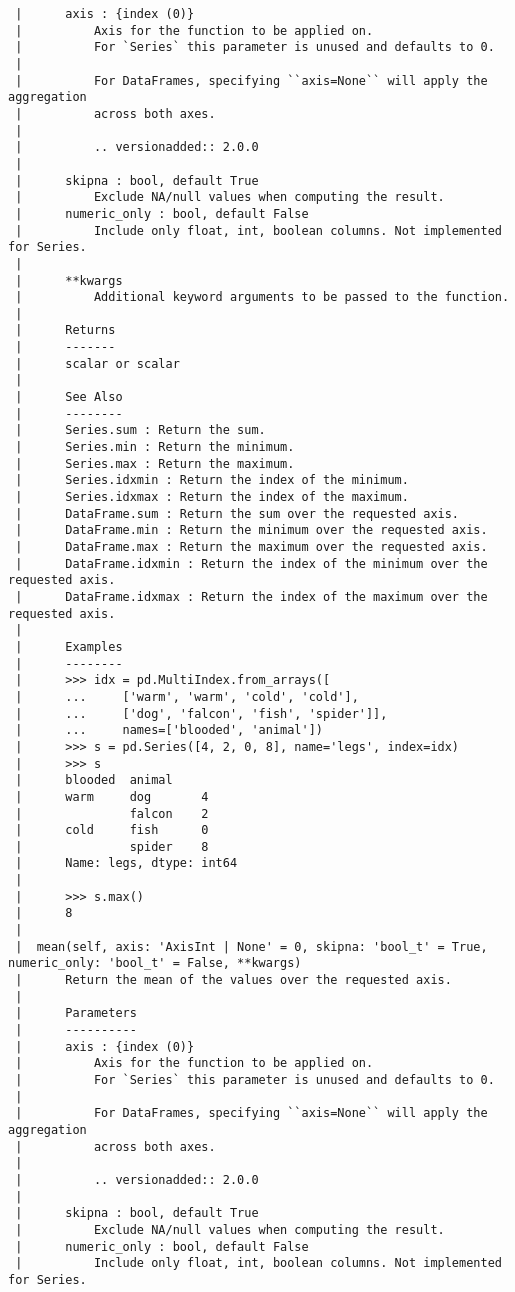 \documentclass[
  letterpaper,
  DIV=11,
  numbers=noendperiod]{scrreprt}
\begin{document}
\begin{verbatim}
 |      axis : {index (0)}
 |          Axis for the function to be applied on.
 |          For `Series` this parameter is unused and defaults to 0.
 |      
 |          For DataFrames, specifying ``axis=None`` will apply the aggregation
 |          across both axes.
 |      
 |          .. versionadded:: 2.0.0
 |      
 |      skipna : bool, default True
 |          Exclude NA/null values when computing the result.
 |      numeric_only : bool, default False
 |          Include only float, int, boolean columns. Not implemented for Series.
 |      
 |      **kwargs
 |          Additional keyword arguments to be passed to the function.
 |      
 |      Returns
 |      -------
 |      scalar or scalar
 |      
 |      See Also
 |      --------
 |      Series.sum : Return the sum.
 |      Series.min : Return the minimum.
 |      Series.max : Return the maximum.
 |      Series.idxmin : Return the index of the minimum.
 |      Series.idxmax : Return the index of the maximum.
 |      DataFrame.sum : Return the sum over the requested axis.
 |      DataFrame.min : Return the minimum over the requested axis.
 |      DataFrame.max : Return the maximum over the requested axis.
 |      DataFrame.idxmin : Return the index of the minimum over the requested axis.
 |      DataFrame.idxmax : Return the index of the maximum over the requested axis.
 |      
 |      Examples
 |      --------
 |      >>> idx = pd.MultiIndex.from_arrays([
 |      ...     ['warm', 'warm', 'cold', 'cold'],
 |      ...     ['dog', 'falcon', 'fish', 'spider']],
 |      ...     names=['blooded', 'animal'])
 |      >>> s = pd.Series([4, 2, 0, 8], name='legs', index=idx)
 |      >>> s
 |      blooded  animal
 |      warm     dog       4
 |               falcon    2
 |      cold     fish      0
 |               spider    8
 |      Name: legs, dtype: int64
 |      
 |      >>> s.max()
 |      8
 |  
 |  mean(self, axis: 'AxisInt | None' = 0, skipna: 'bool_t' = True, numeric_only: 'bool_t' = False, **kwargs)
 |      Return the mean of the values over the requested axis.
 |      
 |      Parameters
 |      ----------
 |      axis : {index (0)}
 |          Axis for the function to be applied on.
 |          For `Series` this parameter is unused and defaults to 0.
 |      
 |          For DataFrames, specifying ``axis=None`` will apply the aggregation
 |          across both axes.
 |      
 |          .. versionadded:: 2.0.0
 |      
 |      skipna : bool, default True
 |          Exclude NA/null values when computing the result.
 |      numeric_only : bool, default False
 |          Include only float, int, boolean columns. Not implemented for Series.

\end{verbatim}
\end{document}
